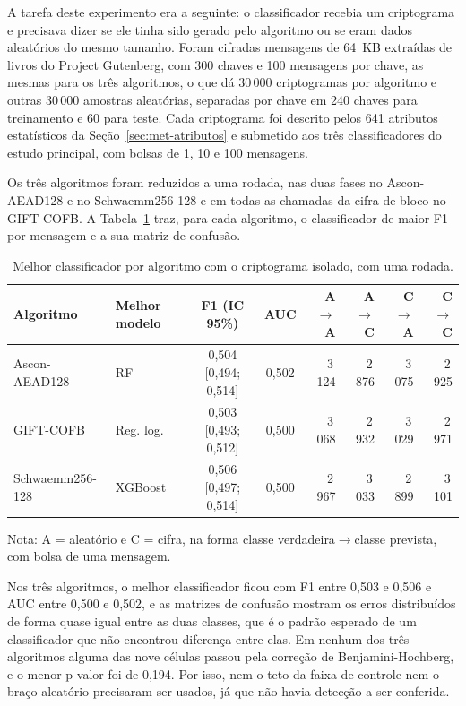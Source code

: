 A tarefa deste experimento era a seguinte: o classificador recebia um criptograma e precisava dizer se ele tinha sido gerado pelo algoritmo ou se eram dados aleatórios do mesmo tamanho. Foram cifradas mensagens de 64~KB extraídas de livros do Project Gutenberg, com 300 chaves e 100 mensagens por chave, as mesmas para os três algoritmos, o que dá 30\,000 criptogramas por algoritmo e outras 30\,000 amostras aleatórias, separadas por chave em 240 chaves para treinamento e 60 para teste. Cada criptograma foi descrito pelos 641 atributos estatísticos da Seção~\ref{sec:met-atributos} e submetido aos três classificadores do estudo principal, com bolsas de 1, 10 e 100 mensagens.

Os três algoritmos foram reduzidos a uma rodada, nas duas fases no Ascon-AEAD128 e no Schwaemm256-128 e em todas as chamadas da cifra de bloco no GIFT-COFB. A Tabela~\ref{tab:res-isolado} traz, para cada algoritmo, o classificador de maior F1 por mensagem e a sua matriz de confusão.

\begin{table}[htb]
\centering
\caption{Melhor classificador por algoritmo com o criptograma isolado, com uma rodada.}
\label{tab:res-isolado}
\footnotesize
\setlength{\tabcolsep}{3pt}
\begin{tabular}{llccrrrr}
\toprule
Algoritmo & Melhor modelo & F1 (IC 95\%) & AUC & A$\to$A & A$\to$C & C$\to$A & C$\to$C \\
\midrule
Ascon-AEAD128 & RF & 0,504 [0,494; 0,514] & 0,502 & 3\,124 & 2\,876 & 3\,075 & 2\,925 \\
GIFT-COFB & Reg. log. & 0,503 [0,493; 0,512] & 0,500 & 3\,068 & 2\,932 & 3\,029 & 2\,971 \\
Schwaemm256-128 & XGBoost & 0,506 [0,497; 0,514] & 0,500 & 2\,967 & 3\,033 & 2\,899 & 3\,101 \\
\bottomrule
\end{tabular}
\par\smallskip\footnotesize Nota: A = aleatório e C = cifra, na forma classe verdadeira$\to$classe prevista, com bolsa de uma mensagem.
\end{table}

Nos três algoritmos, o melhor classificador ficou com F1 entre 0,503 e 0,506 e AUC entre 0,500 e 0,502, e as matrizes de confusão mostram os erros distribuídos de forma quase igual entre as duas classes, que é o padrão esperado de um classificador que não encontrou diferença entre elas. Em nenhum dos três algoritmos alguma das nove células passou pela correção de Benjamini-Hochberg, e o menor p-valor foi de 0,194. Por isso, nem o teto da faixa de controle nem o braço aleatório precisaram ser usados, já que não havia detecção a ser conferida.

